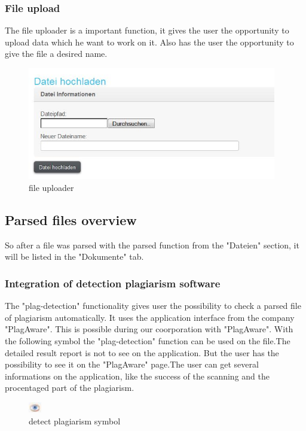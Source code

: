 \subsubsection{File upload}
The file uploader is a important function, it gives the user the opportunity to upload data which he want to work on it. Also has the user the opportunity to give the file a desired name.
\begin{figure}[!ht]
  \centering
    \includegraphics[width=0.97\textwidth]{images/basic_functionalities/datei_hochladen.jpg}
  \caption{file uploader}
  \label{fig:file uploader}
\end{figure}

\subsection{Parsed files overview}
So after a file was parsed with the parsed function from the "Dateien" section, it will be listed in the "Dokumente" tab.
\subsubsection{Integration of detection plagiarism software}
The "plag-detection" functionality gives user the possibility to check a parsed file of plagiarism automatically. It uses the application interface from the company "PlagAware". This is possible during our coorporation with "PlagAware".
With the following symbol the "plag-detection" function can be used on the file.The detailed result report is not to see on the application. But the user has the possibility to see it on the "PlagAware" page.The user can get several informations on the application, like the success of the scanning and the procentaged part of the plagiarism.
\begin{figure}[!ht]
  \centering
    \includegraphics[width=0.05\textwidth]{images/basic_functionalities/plagdetection_symbol.jpg}
  \caption{detect plagiarism symbol}
  \label{detect plagiarism symbol}
\end{figure}
